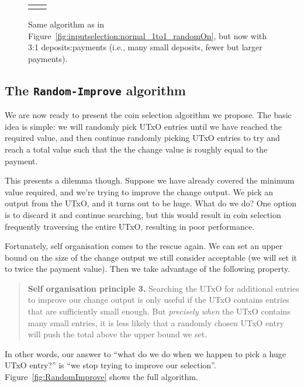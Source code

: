 \documentclass{article}
\theoremstyle{definition}{
  \newtheorem{lemma}{Lemma}[section] %
  \newtheorem{definition}[lemma]{Definition}
}
\theoremstyle{theorem}{
  \newtheorem{invariant}[lemma]{Invariant}
  \newtheorem{proofobligation}[lemma]{Proof Obligation}
}
\numberwithin{equation}{lemma}
\begin{document}
\begin{figure}[p]
\begin{center}
\scriptsize
\begin{tabular}{ll}
 &

\end{tabular}
\end{center}
\caption{\label{fig:inputselection:normal_3to1_randomOn}
Same algorithm as in Figure~\ref{fig:inputselection:normal_1to1_randomOn}, but
now with 3:1 deposits:payments (i.e., many small deposits, fewer but larger
payments).
}
\end{figure}

\clearpage

\subsection{The \texttt{Random-Improve} algorithm}

We are now ready to present the coin selection algorithm we propose. The basic
idea is simple: we will randomly pick UTxO entries until we have reached
the required value, and then continue randomly picking UTxO entries to try and
reach a total value such that the the change value is roughly equal to the
payment.

This presents a dilemma though. Suppose we have already covered the minimum
value required, and we're trying to improve the change output. We pick an
output from the UTxO, and it turns out to be huge. What do we do? One option
is to discard it and continue searching, but this would result in coin selection
frequently traversing the entire UTxO, resulting in poor performance.

Fortunately, self organisation comes to the rescue again. We can set an upper
bound on the size of the change output we still consider acceptable (we will
set it to twice the payment value). Then we take advantage of the following
property.
%
\begin{quote}
\textbf{Self organisation principle 3.} Searching the UTxO for additional
entries to improve our change output is only useful if the UTxO contains entries
that are sufficiently small enough. But \emph{precisely when} the UTxO contains
many small entries, it is less likely that a randomly chosen UTxO entry will
push the total above the upper bound we set.
\end{quote}
%
In other words, our answer to ``what do we do when we happen to pick a huge UTxO
entry?'' is ``we stop trying to improve our selection''.
Figure~\ref{fig:RandomImprove} shows the full algorithm.
\end{document}
